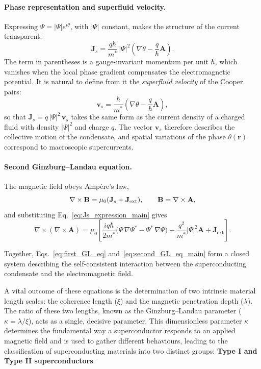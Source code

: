 \paragraph{Phase representation and superfluid velocity.}
Expressing $\Psi = |\Psi| e^{i\theta}$, with $|\Psi|$ constant, makes the structure of the current transparent:
\[
\mathbf{J}_s
= \frac{q\hbar}{m^*}\,|\Psi|^2
\left(\nabla\theta - \frac{q}{\hbar}\mathbf A\right).
\]
The term in parentheses is a gauge-invariant momentum per unit $\hbar$, 
which vanishes when the local phase gradient compensates the electromagnetic potential.  
It is natural to define from it the \emph{superfluid velocity} of the Cooper pairs:
\begin{equation}
\mathbf v_s = \frac{\hbar}{m^*}
\left(\nabla\theta - \frac{q}{\hbar}\mathbf A\right),
\end{equation}
so that $\mathbf J_s = q\,|\Psi|^2\,\mathbf v_s$
takes the same form as the current density of a charged fluid with density $|\Psi|^2$ and charge $q$.
The vector $\mathbf v_s$ therefore describes the collective motion of the condensate,
and spatial variations of the phase $\theta(\mathbf r)$ correspond to macroscopic supercurrents.

\paragraph{Second Ginzburg--Landau equation.}
The magnetic field obeys Ampère’s law,
\[
\nabla\times\mathbf B = \mu_0(\mathbf J_s + \mathbf J_{\rm ext}),
\qquad \mathbf B = \nabla\times\mathbf A,
\]
and substituting Eq.~\eqref{eq:Js_expression_main} gives
\begin{equation}
\boxed{
\nabla \times (\nabla \times \mathbf{A})
= \mu_0
\left[
\frac{i q \hbar}{2 m^*}
\bigl(\Psi\,\nabla\Psi^* - \Psi^*\,\nabla\Psi\bigr)
- \frac{q^2}{m^*}|\Psi|^2\mathbf{A}
+ \mathbf{J}_{\text{ext}}
\right].
}
\label{eq:second_GL_eq_main}
\end{equation}

\bigskip
Together, Eqs.~\eqref{eq:first_GL_eq} and~\eqref{eq:second_GL_eq_main}
form a closed system describing the self-consistent interaction 
between the superconducting condensate and the electromagnetic field.

A vital outcome of these equations is the determination of two intrinsic material length scales: the coherence length ($\xi$) and the magnetic penetration depth ($\lambda$). The ratio of these two lengths, known as the Ginzburg--Landau parameter ($\kappa = \lambda / \xi$), acts as a single, decisive parameter. This dimensionless parameter $\kappa$ determines the fundamental way a superconductor responds to an applied magnetic field and is used to gather different behaviours, leading to the classification of superconducting materials into two distinct groups: \textbf{Type I and Type II superconductors}.


